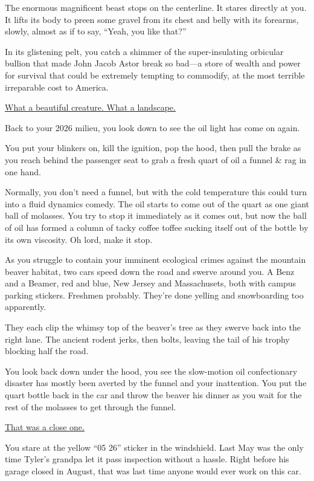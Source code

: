 \documentclass[17pt, twoside, a5paper, openright, extrafontsizes]{memoir}
\renewcommand{\emph}[1]{\ul{#1}}
\begin{document}
The enormous magnificent beast stops on the centerline. It stares
directly at you. It lifts its body to preen some gravel from its chest
and belly with its forearms, slowly, almost as if to say, ``Yeah, you
like that?''

In its glistening pelt, you catch a shimmer of the super-insulating
orbicular bullion that made John Jacob Astor break so bad---a store of
wealth and power for survival that could be extremely tempting to
commodify, at the most terrible irreparable cost to America.

\emph{What a beautiful creature. What a landscape.}

Back to your 2026 milieu, you look down to see the oil light has come on
again.

You put your blinkers on, kill the ignition, pop the hood, then pull the
brake as you reach behind the passenger seat to grab a fresh quart of
oil a funnel \& rag in one hand.

Normally, you don't need a funnel, but with the cold temperature this
could turn into a fluid dynamics comedy. The oil starts to come out of
the quart as one giant ball of molasses. You try to stop it immediately
as it comes out, but now the ball of oil has formed a column of tacky
coffee toffee sucking itself out of the bottle by its own viscosity. Oh
lord, make it stop.

As you struggle to contain your imminent ecological crimes against the
mountain beaver habitat, two cars speed down the road and swerve around
you. A Benz and a Beamer, red and blue, New Jersey and Massachusets,
both with campus parking stickers. Freshmen probably. They're done
yelling and snowboarding too apparently.

They each clip the whimsy top of the beaver's tree as they swerve back
into the right lane. The ancient rodent jerks, then bolts, leaving the
tail of his trophy blocking half the road.

You look back down under the hood, you see the slow-motion oil
confectionary disaster has mostly been averted by the funnel and your
inattention. You put the quart bottle back in the car and throw the
beaver his dinner as you wait for the rest of the molasses to get
through the funnel.

\emph{That was a close one.}

You stare at the yellow ``05 26'' sticker in the windshield. Last May
was the only time Tyler's grandpa let it pass inspection without a
hassle. Right before his garage closed in August, that was last time
anyone would ever work on this car.
\end{document}
